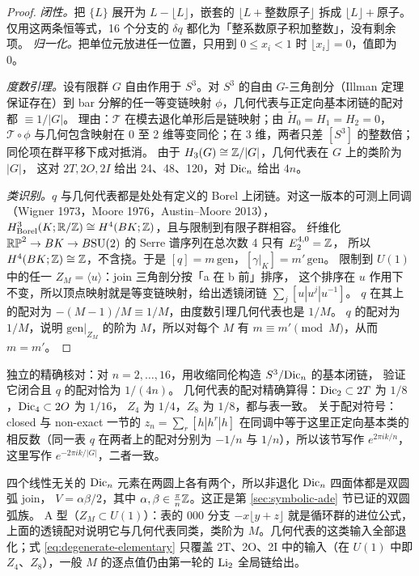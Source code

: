 \begin{proof}
\emph{闭性。}把 $\{L\}$ 展开为 $L-\lfloor L\rfloor$，嵌套的
$\lfloor L+\text{整数原子}\rfloor$ 拆成 $\lfloor L\rfloor+\text{原子}$。
仅用这两条恒等式，16 个分支的 $\delta q$ 都化为「整系数原子积加整数」，没有剩余项。
\emph{归一化。}把单位元放进任一位置，只用到 $0\le x_i<1$ 时 $\lfloor x_i\rfloor=0$，值即为 0。

\emph{度数引理。}设有限群 $G$ 自由作用于 $S^3$。对 $S^3$ 的自由 $G$-三角剖分（Illman 定理保证存在）到 bar 分解的任一等变链映射 $\phi$，几何代表与正定向基本闭链的配对都 $\equiv1/|G|$。
理由：$\mathcal T$ 在模去退化单形后是链映射；由 $\tilde H_0=H_1=H_2=0$，$\mathcal T\circ\phi$ 与几何包含映射在 0 至 2 维等变同伦；在 3 维，两者只差 $[S^3]$ 的整数倍；同伦项在群平移下成对抵消。
由于 $H_3(G)\cong\mathbb Z/|G|$，几何代表在 $G$ 上的类阶为 $|G|$，
这对 $2T,2O,2I$ 给出 24、48、120，对 $\mathrm{Dic}_n$ 给出 $4n$。

\emph{类识别。}$q$ 与几何代表都是处处有定义的 Borel 上闭链。对这一版本的可测上同调（Wigner 1973，Moore 1976，Austin--Moore 2013），
$H^3_{\rm Borel}(K;\mathbb R/\mathbb Z)\cong H^4(BK;\mathbb Z)$，且与限制到有限子群相容。
纤维化 $\mathbb{RP}^2\to BK\to B\mathrm{SU}(2)$ 的 Serre 谱序列在总次数 4 只有 $E_2^{4,0}=\mathbb Z$，
所以 $H^4(BK;\mathbb Z)\cong\mathbb Z$，不含挠。于是 $[q]=m\,\mathrm{gen}$，$[\gamma|_K]=m'\,\mathrm{gen}$。
限制到 $U(1)$ 中的任一 $Z_M=\langle u\rangle$：join 三角剖分按「a 在 b 前」排序，
这个排序在 $u$ 作用下不变，所以顶点映射就是等变链映射，给出透镜闭链 $\sum_j[u|u^j|u^{-1}]$。
$q$ 在其上的配对为 $-(M-1)/M\equiv1/M$，由度数引理几何代表也是 $1/M$。
$q$ 的配对为 $1/M$，说明 $\mathrm{gen}|_{Z_M}$ 的阶为 $M$，所以对每个 $M$ 有 $m\equiv m'\pmod M$，从而 $m=m'$。
\end{proof}

独立的精确核对：对 $n=2,\ldots,16$，用收缩同伦构造 $S^3/\mathrm{Dic}_n$ 的基本闭链，
验证它闭合且 $q$ 的配对恰为 $1/(4n)$。
几何代表的配对精确算得：$\mathrm{Dic}_2\subset2T$ 为 $1/8$，$\mathrm{Dic}_4\subset2O$ 为 $1/16$，
$Z_4$ 为 $1/4$，$Z_8$ 为 $1/8$，都与表一致。
关于配对符号：closed 与 non-exact 一节的 $z_n=\sum_r[h|h^r|h]$ 在同调中等于这里正定向基本类的相反数（同一表 $q$ 在两者上的配对分别为 $-1/n$ 与 $1/n$），所以该节写作 $e^{2\pi ik/n}$，这里写作 $e^{-2\pi ik/|G|}$，二者一致。

四个线性无关的 $\mathrm{Dic}_n$ 元素在两圆上各有两个，所以非退化 $\mathrm{Dic}_n$ 四面体都是双圆弧 join，
$V=\alpha\beta/2$，其中 $\alpha,\beta\in\frac\pi n\mathbb Z$。这正是第 \ref{sec:symbolic-ade} 节已证的双圆弧族。
A 型（$Z_M\subset U(1)$）：表的 000 分支 $-x\lfloor y+z\rfloor$ 就是循环群的进位公式，上面的透镜配对说明它与几何代表同类，类阶为 $M$。几何代表的这类输入全部退化；式 \eqref{eq:degenerate-elementary} 只覆盖 2T、2O、2I 中的输入（在 $U(1)$ 中即 $Z_4$、$Z_8$），一般 $M$ 的逐点值仍由第一轮的 $\operatorname{Li}_2$ 全局链给出。

